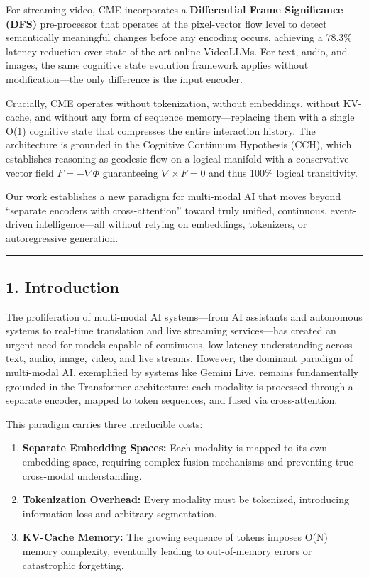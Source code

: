 \documentclass[
  11pt,
  a4paper,
]{article}
\providecommand{\tightlist}{%
  \setlength{\itemsep}{0pt}\setlength{\parskip}{0pt}}
\begin{document}
For streaming video, CME incorporates a \textbf{Differential Frame
Significance (DFS)} pre-processor that operates at the pixel-vector flow
level to detect semantically meaningful changes before any encoding
occurs, achieving a 78.3\% latency reduction over state-of-the-art
online VideoLLMs. For text, audio, and images, the same cognitive state
evolution framework applies without modification---the only difference
is the input encoder.

Crucially, CME operates without tokenization, without embeddings,
without KV-cache, and without any form of sequence memory---replacing
them with a single O(1) cognitive state that compresses the entire
interaction history. The architecture is grounded in the Cognitive
Continuum Hypothesis (CCH), which establishes reasoning as geodesic flow
on a logical manifold with a conservative vector field
\(F = -\nabla\Phi\) guaranteeing \(\nabla \times F = 0\) and thus 100\%
logical transitivity.

Our work establishes a new paradigm for multi-modal AI that moves beyond
``separate encoders with cross-attention'' toward truly unified,
continuous, event-driven intelligence---all without relying on
embeddings, tokenizers, or autoregressive generation.

\begin{center}\rule{0.5\linewidth}{0.5pt}\end{center}

\subsection{1. Introduction}\label{introduction}

The proliferation of multi-modal AI systems---from AI assistants and
autonomous systems to real-time translation and live streaming
services---has created an urgent need for models capable of continuous,
low-latency understanding across text, audio, image, video, and live
streams. However, the dominant paradigm of multi-modal AI, exemplified
by systems like Gemini Live, remains fundamentally grounded in the
Transformer architecture: each modality is processed through a separate
encoder, mapped to token sequences, and fused via cross-attention.

This paradigm carries three irreducible costs:

\begin{enumerate}
\def\labelenumi{\arabic{enumi}.}
\tightlist
\item
  \textbf{Separate Embedding Spaces:} Each modality is mapped to its own
  embedding space, requiring complex fusion mechanisms and preventing
  true cross-modal understanding.
\item
  \textbf{Tokenization Overhead:} Every modality must be tokenized,
  introducing information loss and arbitrary segmentation.
\item
  \textbf{KV-Cache Memory:} The growing sequence of tokens imposes O(N)
  memory complexity, eventually leading to out-of-memory errors or
  catastrophic forgetting.
\end{enumerate}
\end{document}
